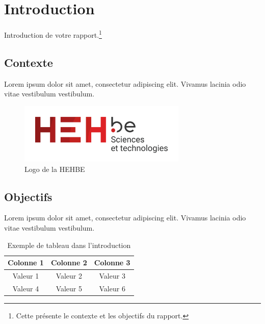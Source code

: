 \section{Introduction}
Introduction de votre rapport.\footnote{Cette présente le contexte et les objectifs du rapport.}

\subsection{Contexte}
Lorem ipsum dolor sit amet, consectetur adipiscing elit. Vivamus lacinia odio vitae vestibulum vestibulum.

\begin{figure}[!ht]
    \centering
    \includegraphics[width=8cm]{img/logo_hehbe_tech.png}
    \caption{Logo de la HEHBE}
    \label{fig:example_figure}
\end{figure}

\subsection{Objectifs}
Lorem ipsum dolor sit amet, consectetur adipiscing elit. Vivamus lacinia odio vitae vestibulum vestibulum.

\begin{table}[!ht]
    \centering
    \begin{tabular}{|c|c|c|}
        \hline
        Colonne 1 & Colonne 2 & Colonne 3 \\
        \hline
        Valeur 1 & Valeur 2 & Valeur 3 \\
        \hline
        Valeur 4 & Valeur 5 & Valeur 6 \\
        \hline
    \end{tabular}
    \caption{ Exemple de tableau dans l'introduction}
    \label{tab:example_table}
\end{table}


